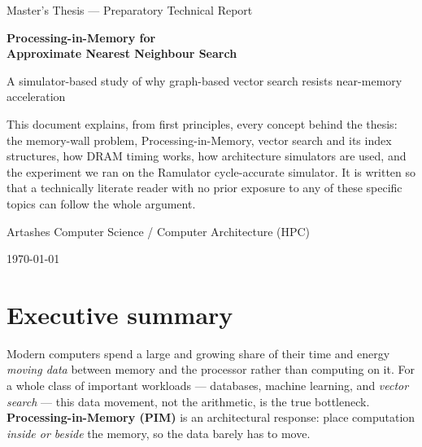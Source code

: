 \documentclass[11pt,a4paper]{article}
\newcommand{\term}[1]{\textbf{\color{slate}#1}}
\begin{document}
\begin{titlepage}
\centering
\vspace*{2.5cm}
{\color{gray}\large Master's Thesis --- Preparatory Technical Report\par}
\vspace{1.2cm}
{\color{slate}\Huge\bfseries Processing-in-Memory for\\[0.3cm] Approximate Nearest Neighbour Search\par}
\vspace{0.8cm}
{\color{teal}\Large A simulator-based study of why graph-based vector search resists near-memory acceleration\par}
\vspace{2.0cm}
\begin{minipage}{0.8\textwidth}\centering\color{gray}\normalsize
This document explains, from first principles, every concept behind the thesis: the memory-wall
problem, Processing-in-Memory, vector search and its index structures, how DRAM timing works, how
architecture simulators are used, and the experiment we ran on the Ramulator cycle-accurate
simulator. It is written so that a technically literate reader with no prior exposure to any of
these specific topics can follow the whole argument.
\end{minipage}
\vfill
{\color{gray} Artashes \quad\textbullet\quad Computer Science / Computer Architecture (HPC)\par}
\vspace{0.4cm}
{\color{gray}\today\par}
\end{titlepage}

\tableofcontents
\newpage

\section{Executive summary}

Modern computers spend a large and growing share of their time and energy \emph{moving data}
between memory and the processor rather than computing on it. For a whole class of important
workloads --- databases, machine learning, and \emph{vector search} --- this data movement, not the
arithmetic, is the true bottleneck. \term{Processing-in-Memory (PIM)} is an architectural response:
place computation \emph{inside or beside} the memory, so the data barely has to move.
\end{document}
